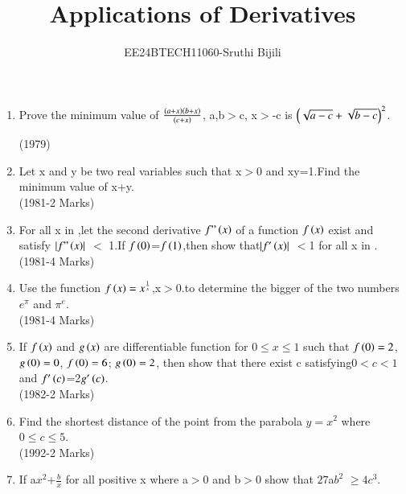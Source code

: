 \documentclass[journal,12pt,twocolumn]{IEEEtran}
\theoremstyle{remark}
\begin{document}

\vspace{3cm}
\title{Applications of Derivatives}
\author{EE24BTECH11060-Sruthi Bijili}
\maketitle

\bigskip
\renewcommand{\thefigure}{\theenumi}
\renewcommand{\thetable}{\theenumi}
\begin{enumerate}
\item  Prove the minimum value of $\frac{\left(a+x\right)\left(b+x\right)}{\left(c+x\right)}$,
a,b$>$c, x$>$-c is ${\left(\sqrt{a-c}+\sqrt{b-c}\right)}^2$. 
           
\hfill{(1979})


\item  Let x and y be two real variables such that x$>$0 and xy=1.Find the minimum value of x+y.\\

\hfill{(1981-2 Marks)}

\item  For all x in ,let the second derivative $f"\left(x\right)$ of a function $f\left(x\right)$ exist and satisfy $\left\vert f"\left(x\right)\right\vert$ $<$ 1.If $f\left(0\right)$=$f\left(1\right)$,then show that$\left\vert f'\left(x\right)\right\vert$ $<$1 for all x in .\\

\hfill{(1981-4 Marks)}

\item  Use the function $f\left(x\right)=x^\frac{1}{x}$,x$>$0.to determine the bigger of the two numbers $e^\pi$ and $\pi^e$.\\

\hfill{(1981-4 Marks)}

\item  If $f\left(x\right)$ and $g\left(x\right)$ are differentiable function for $0\leq x \leq1$ such that $f\left(0\right)=2$, $g\left(0\right)=0$, $f\left(0\right)=6$; $g\left(0\right)=2$, then show that there exist c satisfying$ 0<c<1 $and $f'\left(c\right)$=2$g'\left(c\right)$.\\

\hfill{(1982-2 Marks)}

\item  Find the shortest distance of the point from the parabola $y=x^2$ where $0\leq c \leq5$.\\

\hfill{(1992-2 Marks)}

\item  If a$x^2$+$\frac{b}{x}$  for all positive x where a$>$0 and b$>$0 show that $27$a$b^2$ $\geq$$4c^3$.\\


\end{enumerate}
\end{document}
